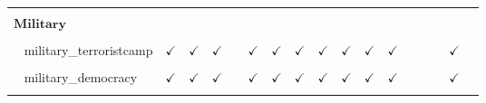 \documentclass[
  12pt]{article}
\begin{document}
\begin{table}[H]
{\begin{tabular}{lcccccccccccccccc}
\cellcolor{gray!6}{$\hspace{10pt}$immig\_wall} & \cellcolor{gray!6}{} & \cellcolor{gray!6}{} & \cellcolor{gray!6}{} & \cellcolor{gray!6}{} & \cellcolor{gray!6}{} & \cellcolor{gray!6}{} & \cellcolor{gray!6}{} & \cellcolor{gray!6}{} & \cellcolor{gray!6}{} & \cellcolor{gray!6}{} & \cellcolor{gray!6}{} & \cellcolor{gray!6}{$\checkmark$} & \cellcolor{gray!6}{$\checkmark$} & \cellcolor{gray!6}{} & \cellcolor{gray!6}{$\checkmark$} & \cellcolor{gray!6}{$\checkmark$}\\
$\textbf{Military}$ &  &  &  &  &  &  &  &  &  &  &  &  &  &  &  & \\
\cellcolor{gray!6}{$\hspace{10pt}$military\_oil} & \cellcolor{gray!6}{$\checkmark$} & \cellcolor{gray!6}{$\checkmark$} & \cellcolor{gray!6}{$\checkmark$} & \cellcolor{gray!6}{} & \cellcolor{gray!6}{$\checkmark$} & \cellcolor{gray!6}{$\checkmark$} & \cellcolor{gray!6}{$\checkmark$} & \cellcolor{gray!6}{$\checkmark$} & \cellcolor{gray!6}{$\checkmark$} & \cellcolor{gray!6}{$\checkmark$} & \cellcolor{gray!6}{$\checkmark$} & \cellcolor{gray!6}{} & \cellcolor{gray!6}{} & \cellcolor{gray!6}{} & \cellcolor{gray!6}{$\checkmark$} & \cellcolor{gray!6}{}\\
$\hspace{10pt}$military\_terroristcamp & $\checkmark$ & $\checkmark$ & $\checkmark$ &  & $\checkmark$ & $\checkmark$ & $\checkmark$ & $\checkmark$ & $\checkmark$ & $\checkmark$ & $\checkmark$ &  &  &  & $\checkmark$ & \\
\cellcolor{gray!6}{$\hspace{10pt}$military\_genocide} & \cellcolor{gray!6}{$\checkmark$} & \cellcolor{gray!6}{$\checkmark$} & \cellcolor{gray!6}{$\checkmark$} & \cellcolor{gray!6}{} & \cellcolor{gray!6}{$\checkmark$} & \cellcolor{gray!6}{$\checkmark$} & \cellcolor{gray!6}{$\checkmark$} & \cellcolor{gray!6}{$\checkmark$} & \cellcolor{gray!6}{$\checkmark$} & \cellcolor{gray!6}{$\checkmark$} & \cellcolor{gray!6}{$\checkmark$} & \cellcolor{gray!6}{} & \cellcolor{gray!6}{} & \cellcolor{gray!6}{} & \cellcolor{gray!6}{$\checkmark$} & \cellcolor{gray!6}{}\\
$\hspace{10pt}$military\_democracy & $\checkmark$ & $\checkmark$ & $\checkmark$ &  & $\checkmark$ & $\checkmark$ & $\checkmark$ & $\checkmark$ & $\checkmark$ & $\checkmark$ & $\checkmark$ &  &  &  & $\checkmark$ & \\
\cellcolor{gray!6}{$\hspace{10pt}$military\_protectallies} & \cellcolor{gray!6}{$\checkmark$} & \cellcolor{gray!6}{$\checkmark$} & \cellcolor{gray!6}{$\checkmark$} & \cellcolor{gray!6}{} & \cellcolor{gray!6}{$\checkmark$} & \cellcolor{gray!6}{$\checkmark$} & \cellcolor{gray!6}{$\checkmark$} & \cellcolor{gray!6}{$\checkmark$} & \cellcolor{gray!6}{$\checkmark$} & \cellcolor{gray!6}{$\checkmark$} & \cellcolor{gray!6}{$\checkmark$} & \cellcolor{gray!6}{} & \cellcolor{gray!6}{} & \cellcolor{gray!6}{} & \cellcolor{gray!6}{$\checkmark$} & \cellcolor{gray!6}{}\\

\end{tabular}}
\end{table}
\end{document}
